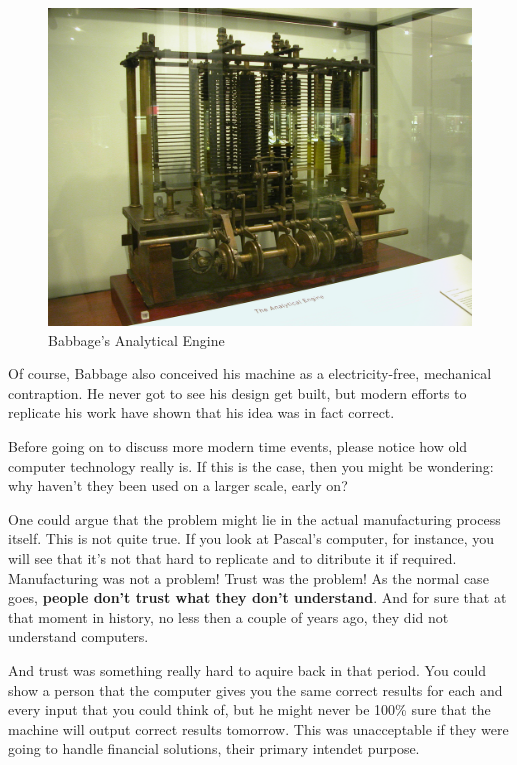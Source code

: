\documentclass[12pt, a4paper]{book}
\begin{document}
\begin{figure}[h]
  \centering
  \includegraphics[scale=0.1]{./img/altele/analytical_engine.jpg}
  \caption{Babbage's Analytical Engine}
  \label{fig:analytical engine}
\end{figure}

Of course, Babbage also conceived his machine as a electricity-free, mechanical contraption. He never got to see his design get built, but modern efforts to replicate his work have shown that his idea was in fact correct.  

Before going on to discuss more modern time events, please notice how old computer technology really is. If this is the case, then you might be wondering: why haven't they been used on a larger scale, early on?

One could argue that the problem might lie in the actual manufacturing process itself. This is not quite true. If you look at Pascal's computer, for instance, you will see that it's not that hard to replicate and to ditribute it if required. Manufacturing was not a problem! Trust was the problem! As the normal case goes, \textbf{people don't trust what they don't understand}. And for sure that at that moment in history, no less then a couple of years ago, they did not understand computers.

And trust was something really hard to aquire back in that period. You could show a person that the computer gives you the same correct results for each and every input that you could think of, but he might never be 100\% sure that the machine will output correct results tomorrow. This was unacceptable if they were going to handle financial solutions, their primary intendet purpose. 
\end{document}

